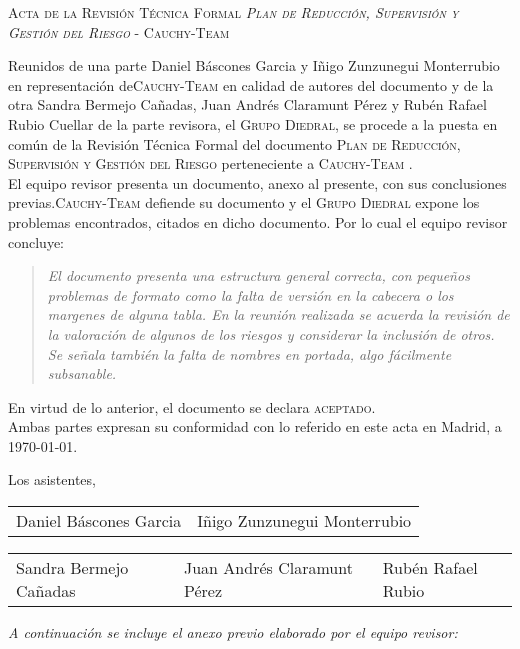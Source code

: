 \documentclass[11pt, a4paper, twoside]{article}
\newcommand*{\Cauchy}{\mbox{\textsc{Cauchy-Team}} }
\begin{document}
	\begin{center}
		\scshape \large Acta de la Revisión Técnica Formal \textit{Plan de Reducción, Supervisión y Gestión del Riesgo} - \Cauchy
	\end{center}

	Reunidos de una parte Daniel Báscones Garcia y Iñigo Zunzunegui Monterrubio en representación de\break \Cauchy en calidad de autores del documento y de la otra Sandra Bermejo Cañadas, Juan Andrés Claramunt Pérez y Rubén Rafael Rubio Cuellar de la parte revisora, el \textsc{Grupo Diedral}, se procede a la puesta en común de la Revisión Técnica Formal del documento \textsc{Plan de Reducción, Supervisión y Gestión del Riesgo} perteneciente a \Cauchy. \\

	El equipo revisor presenta un documento, anexo al presente, con sus conclusiones previas.\break \Cauchy defiende su documento y el \textsc{Grupo Diedral} expone los problemas encontrados, citados en dicho documento. Por lo cual el equipo revisor concluye:

\begin{quotation} \itshape
	El documento presenta una estructura general correcta, con pequeños problemas de formato como la falta de versión en la cabecera o los margenes de alguna tabla. En la reunión realizada se acuerda la revisión de la valoración de algunos de los riesgos y considerar la inclusión de otros. Se señala también la falta de nombres en portada, algo fácilmente subsanable.
\end{quotation}

\noindent
En virtud de lo anterior, el documento se declara \textsc{aceptado}.\\

	Ambas partes expresan su conformidad con lo referido en este acta en Madrid, a \today.

\begin{flushleft}
	Los asistentes,
\end{flushleft}

\vspace{1cm}

	\begin{tabu} to .9\linewidth {X[1,c] X[1, c]}
		Daniel Báscones Garcia & Iñigo Zunzunegui Monterrubio
	\end{tabu}

	\vfill

	\begin{tabu} to .9\linewidth {X[1,c] X[1, c]}
		Sandra Bermejo Cañadas & Juan Andrés Claramunt Pérez & Rubén Rafael Rubio
	\end{tabu}
	
	\vfill
	{\itshape A continuación se incluye el anexo previo elaborado por el equipo revisor: }

	
\end{document}
